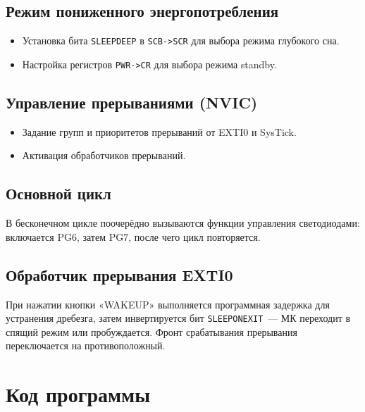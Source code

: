 \documentclass[a4paper, final]{article}
\begin{document}
\subsection{Режим пониженного энергопотребления}
\begin{itemize}
    \item Установка бита \texttt{SLEEPDEEP} в \texttt{SCB->SCR} для выбора режима глубокого сна.
    \item Настройка регистров \texttt{PWR->CR} для выбора режима standby.
\end{itemize}

\subsection{Управление прерываниями (NVIC)}
\begin{itemize}
    \item Задание групп и приоритетов прерываний от EXTI0 и SysTick.
    \item Активация обработчиков прерываний.
\end{itemize}

\subsection{Основной цикл}
В бесконечном цикле поочерёдно вызываются функции управления светодиодами: включается PG6, затем PG7, после чего цикл повторяется.

\subsection{Обработчик прерывания EXTI0}
При нажатии кнопки «WAKEUP» выполняется программная задержка для устранения дребезга, затем инвертируется бит \texttt{SLEEPONEXIT}~--- МК переходит в спящий режим или пробуждается. Фронт срабатывания прерывания переключается на противоположный.

\newpage

\section{Код программы}
\end{document}
